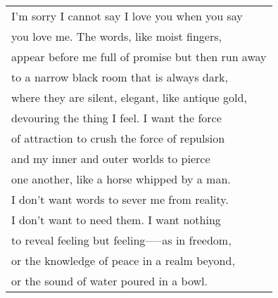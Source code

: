 \documentclass{article}
\begin{document}
\begin{center}
  \begin{tabular}{l}

I'm sorry I cannot say I love you when you say \\
you love me. The words, like moist fingers, \\
appear before me full of promise but then run away \\
to a narrow black room that is always dark, \\
where they are silent, elegant, like antique gold, \\
devouring the thing I feel. I want the force \\
of attraction to crush the force of repulsion \\
and my inner and outer worlds to pierce \\
one another, like a horse whipped by a man. \\
I don't want words to sever me from reality. \\
I don't want to need them. I want nothing \\
to reveal feeling but feeling—--as in freedom, \\
or the knowledge of peace in a realm beyond, \\
or the sound of water poured in a bowl.

  \end{tabular}
  \end{center}


\vfill

\phantom{ok}
\end{document}
